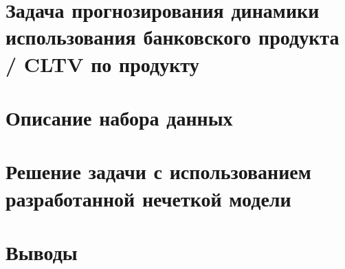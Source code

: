 \section{Задача прогнозирования динамики использования банковского продукта / CLTV по продукту}

\section{Описание набора данных}

\section{Решение задачи с использованием разработанной нечеткой модели}


\section{Выводы}